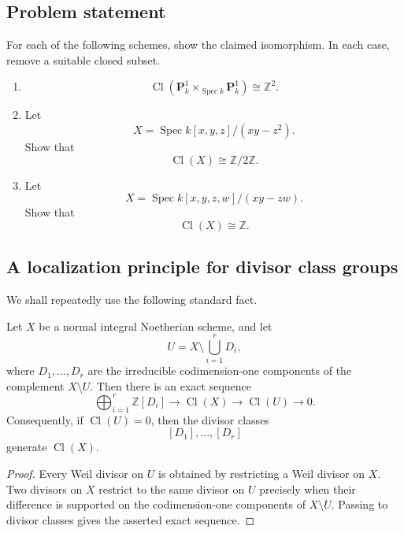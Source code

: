 
\subsection*{Problem statement}

For each of the following schemes, show the claimed isomorphism. In each case, remove a suitable closed subset.

\begin{enumerate}[label=(\alph*)]
	\item
	\[
	\operatorname{Cl}\!\left(\mathbf{P}^1_k \times_{\operatorname{Spec} k} \mathbf{P}^1_k\right)\cong \mathbb{Z}^2.
	\]
	
	\item Let
	\[
	X=\operatorname{Spec} k[x,y,z]/(xy-z^2).
	\]
	Show that
	\[
	\operatorname{Cl}(X)\cong \mathbb{Z}/2\mathbb{Z}.
	\]
	
	\item Let
	\[
	X=\operatorname{Spec} k[x,y,z,w]/(xy-zw).
	\]
	Show that
	\[
	\operatorname{Cl}(X)\cong \mathbb{Z}.
	\]
\end{enumerate}

\subsection{A localization principle for divisor class groups}

We shall repeatedly use the following standard fact.

\begin{proposition}
	Let \(X\) be a normal integral Noetherian scheme, and let
	\[
	U=X\setminus \bigcup_{i=1}^{r}D_i,
	\]
	where \(D_1,\dots,D_r\) are the irreducible codimension-one components of the complement \(X\setminus U\). Then there is an exact sequence
	\[
	\bigoplus_{i=1}^{r}\mathbb{Z}[D_i]
	\longrightarrow
	\operatorname{Cl}(X)
	\longrightarrow
	\operatorname{Cl}(U)
	\longrightarrow 0.
	\]
	Consequently, if \(\operatorname{Cl}(U)=0\), then the divisor classes
	\[
	[D_1],\dots,[D_r]
	\]
	generate \(\operatorname{Cl}(X)\).
\end{proposition}

\begin{proof}
	Every Weil divisor on \(U\) is obtained by restricting a Weil divisor on \(X\). Two divisors on \(X\) restrict to the same divisor on \(U\) precisely when their difference is supported on the codimension-one components of \(X\setminus U\). Passing to divisor classes gives the asserted exact sequence.
\end{proof}

